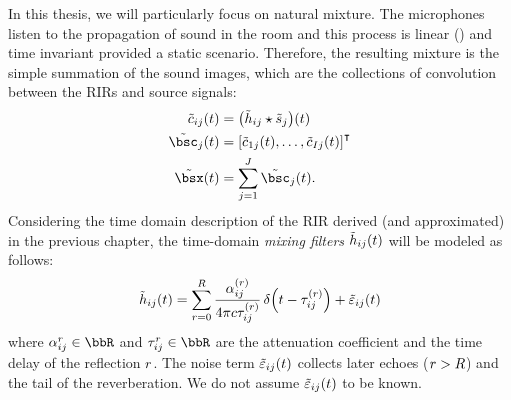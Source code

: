 \mynewline
In this thesis, we will particularly focus on natural mixture.
The microphones listen to the propagation of sound in the room and this process is linear () and time invariant provided a static scenario.
Therefore, the resulting mixture is the simple summation of the sound images,
which are the collections of convolution between the \acp{RIR} and source signals:
\begin{align}
    \tilde{\img}_{\idxMicSrc}(t) &= \kparen{\tilde{\rir}_{\idxMicSrc} \convCont \tilde{\src}_\idxSrc} (t)     \label{eq:processing:mixing:img} \\
    \tilde{\imgs}_\idxSrc(t)         &= \ktranspose{\klist{\tilde{\img}_{1\idxSrc}(t), \dots, \tilde{\img}_{\numMics\idxSrc}(t)}} \nonumber\\
    \tilde{\mics}(t)                 &= \sum_{\idxSrc=1}^{\numSrcs} \tilde{\imgs}_\idxSrc(t)                    \label{eq:processing:mixing:mix}
    .
\end{align}%
Considering the time domain description of the \ac{RIR} derived (and approximated) in the previous chapter,
the time-domain \emph{mixing filters} $\tilde{h}_{ij}( t)$ will be modeled as follows:
\begin{equation}\label{eq:processing:mixing_filter}
    \tilde{h}_{\idxMicSrc}( t) = \sum_{\idxEch=0}^{\numEchs} \frac{\absCoeff_{\idxMicSrc}^{(r)}}{4 \pi \speedOfSound \tau_{\idxMicSrc}^{(r)}}
                          \diracOf{t - \tau_{\idxMicSrc}^{(r)}} + \tilde{\varepsilon}_{\idxMicSrc}(t)
\end{equation}
where $\absCoeff_{\idxMicSrc}^r \in \R$ and $\tau_{\idxMicSrc}^r \in \R$ are the attenuation coefficient and the time delay of the reflection $r$.
The noise term $\tilde{\varepsilon}_{ij}( t)$ collects later echoes ($r > R$) and the tail of the reverberation.
We do not assume $\tilde{\varepsilon}_{ij}( t)$ to be known.

